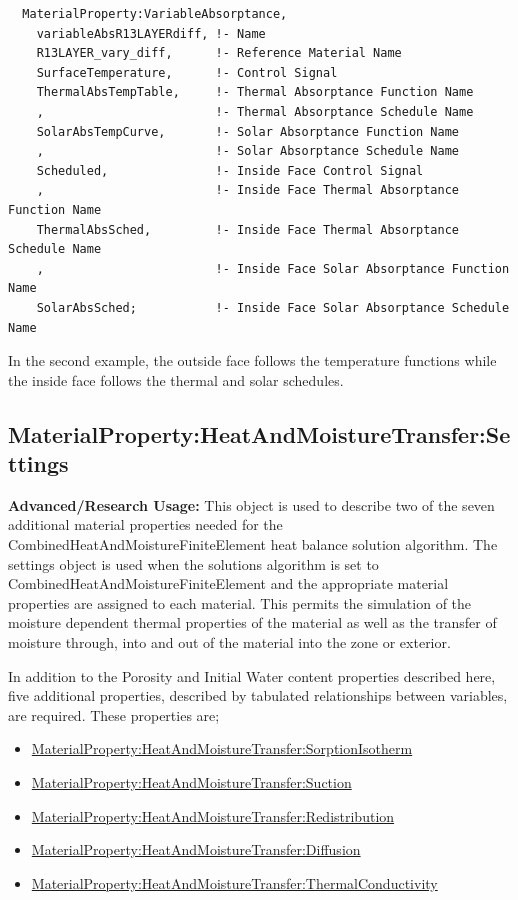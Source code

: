 \begin{lstlisting}
  MaterialProperty:VariableAbsorptance,
    variableAbsR13LAYERdiff, !- Name
    R13LAYER_vary_diff,      !- Reference Material Name
    SurfaceTemperature,      !- Control Signal
    ThermalAbsTempTable,     !- Thermal Absorptance Function Name
    ,                        !- Thermal Absorptance Schedule Name
    SolarAbsTempCurve,       !- Solar Absorptance Function Name
    ,                        !- Solar Absorptance Schedule Name
    Scheduled,               !- Inside Face Control Signal
    ,                        !- Inside Face Thermal Absorptance Function Name
    ThermalAbsSched,         !- Inside Face Thermal Absorptance Schedule Name
    ,                        !- Inside Face Solar Absorptance Function Name
    SolarAbsSched;           !- Inside Face Solar Absorptance Schedule Name
\end{lstlisting}

In the second example, the outside face follows the temperature functions while the inside face follows the thermal and solar schedules.

\subsection{MaterialProperty:HeatAndMoistureTransfer:Settings}\label{materialpropertyheatandmoisturetransfersettings}

\textbf{Advanced/Research Usage:} This object is used to describe two of the seven additional material properties needed for the CombinedHeatAndMoistureFiniteElement heat balance solution algorithm. The settings object is used when the solutions algorithm is set to CombinedHeatAndMoistureFiniteElement and the appropriate material properties are assigned to each material. This permits the simulation of the moisture dependent thermal properties of the material as well as the transfer of moisture through, into and out of the material into the zone or exterior.

In addition to the Porosity and Initial Water content properties described here, five additional properties, described by tabulated relationships between variables, are required. These properties are;

\begin{itemize}
\item
  \hyperref[materialpropertyheatandmoisturetransfersorptionisotherm]{MaterialProperty:HeatAndMoistureTransfer:SorptionIsotherm}
\item
  \hyperref[materialpropertyheatandmoisturetransfersuction]{MaterialProperty:HeatAndMoistureTransfer:Suction}
\item
  \hyperref[materialpropertyheatandmoisturetransferredistribution]{MaterialProperty:HeatAndMoistureTransfer:Redistribution}
\item
  \hyperref[materialpropertyheatandmoisturetransferdiffusion]{MaterialProperty:HeatAndMoistureTransfer:Diffusion}
\item
  \hyperref[materialpropertyheatandmoisturetransferthermalconductivity]{MaterialProperty:HeatAndMoistureTransfer:ThermalConductivity}
\end{itemize}

